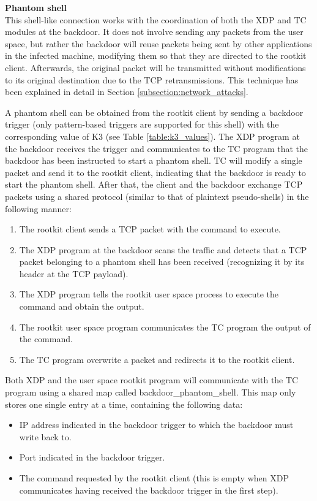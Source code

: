 \textbf{Phantom shell}\\
This shell-like connection works with the coordination of both the XDP and TC modules at the backdoor. It does not involve sending any packets from the user space, but rather the backdoor will reuse packets being sent by other applications in the infected machine, modifying them so that they are directed to the rootkit client. Afterwards, the original packet will be transmitted without modifications to its original destination due to the TCP retransmissions. This technique has been explained in detail in Section \ref{subsection:network_attacks}.

A phantom shell can be obtained from the rootkit client by sending a backdoor trigger (only pattern-based triggers are supported for this shell) with the corresponding value of K3 (see Table \ref{table:k3_values}). The XDP program at the backdoor receives the trigger and communicates to the TC program that the backdoor has been instructed to start a phantom shell. TC will modify a single packet and send it to the rootkit client, indicating that the backdoor is ready to start the phantom shell. After that, the client and the backdoor exchange TCP packets using a shared protocol (similar to that of plaintext pseudo-shells) in the following manner:
\begin{enumerate}
\item The rootkit client sends a TCP packet with the command to execute.
\item The XDP program at the backdoor scans the traffic and detects that a TCP packet belonging to a phantom shell has been received (recognizing it by its header at the TCP payload).
\item The XDP program tells the rootkit user space process to execute the command and obtain the output.
\item The rootkit user space program communicates the TC program the output of the command.
\item The TC program overwrite a packet and redirects it to the rootkit client.
\end{enumerate}

Both XDP and the user space rootkit program will communicate with the TC program using a shared map called backdoor\_phantom\_shell. This map only stores one single entry at a time, containing the following data:
\begin{itemize}
\item IP address indicated in the backdoor trigger to which the backdoor must write back to.
\item Port indicated in the backdoor trigger.
\item The command requested by the rootkit client (this is empty when XDP communicates having received the backdoor trigger in the first step).
\end{itemize}

